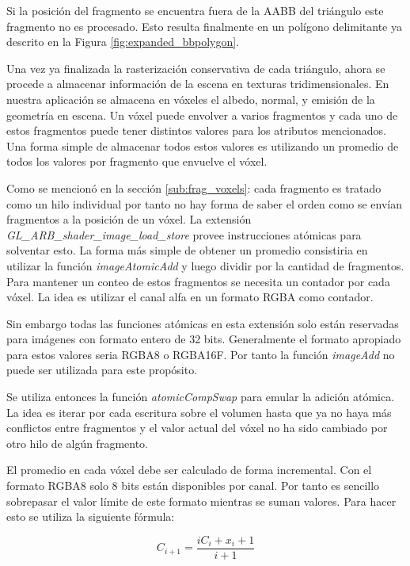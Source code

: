 Si la posición del fragmento se encuentra fuera de la \ac{AABB} del triángulo este fragmento no es procesado. Esto resulta finalmente en un polígono delimitante ya descrito en la Figura \ref{fig:expanded_bbpolygon}.

Una vez ya finalizada la rasterización conservativa de cada triángulo, ahora se procede a almacenar información de la escena en texturas tridimensionales. En nuestra aplicación se almacena en vóxeles el albedo, normal, y emisión de la geometría en escena. Un vóxel puede envolver a varios fragmentos y cada uno de estos fragmentos puede tener distintos valores para los atributos mencionados. Una forma simple de almacenar todos estos valores es utilizando un promedio de todos los valores por fragmento que envuelve el vóxel. 

Como se mencionó en la sección \ref{sub:frag_voxels}: cada fragmento es tratado como un hilo individual por tanto no hay forma de saber el orden como se envían fragmentos a la posición de un vóxel. La extensión \emph{GL\_ARB\_shader\_image\_load\_store} provee instrucciones atómicas para solventar esto. La forma más simple de obtener un promedio consistiria en utilizar la función \emph{imageAtomicAdd} y luego dividir por la cantidad de fragmentos. Para mantener un conteo de estos fragmentos se necesita un contador por cada vóxel. La idea es utilizar el canal alfa en un formato RGBA como contador. 

Sin embargo todas las funciones atómicas en esta extensión solo están reservadas para imágenes con formato entero de 32 bits. Generalmente el formato apropiado para estos valores seria RGBA8 o RGBA16F. Por tanto la función \emph{imageAdd} no puede ser utilizada para este propósito.

Se utiliza entonces la función \emph{atomicCompSwap} para emular la adición atómica. La idea es iterar por cada escritura sobre el volumen hasta que ya no haya más conflictos entre fragmentos y el valor actual del vóxel no ha sido cambiado por otro hilo de algún fragmento.

El promedio en cada vóxel debe ser calculado de forma incremental. Con el formato RGBA8 solo 8 bits están disponibles por canal. Por tanto es sencillo sobrepasar el valor límite de este formato mientras se suman valores. Para hacer esto se utiliza la siguiente fórmula:

\begin{equation}
	C_{i+1} = \frac{iC_{i}+x_i+1}{i+1}
\end{equation}

